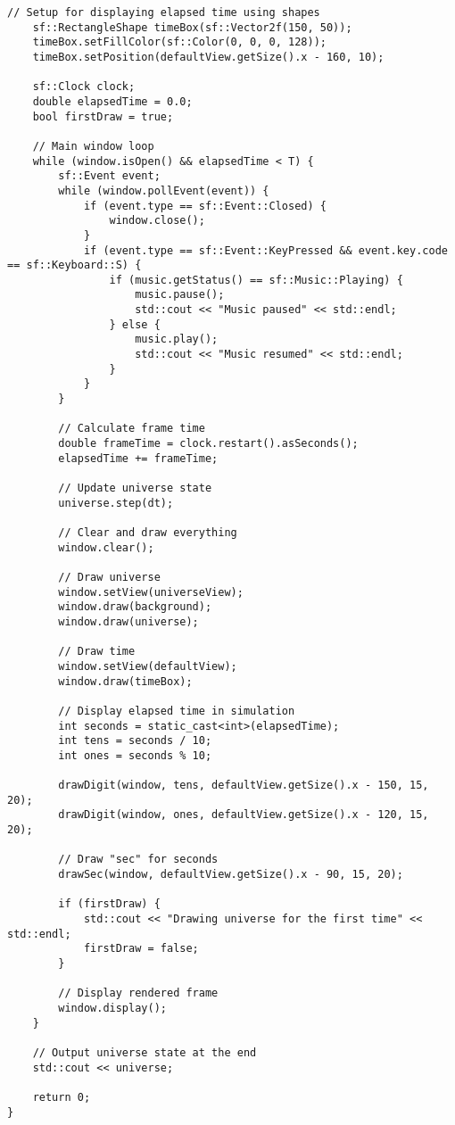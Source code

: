 \documentclass[12pt]{article}
\begin{document}
\begin{lstlisting}[style=cppcode]
    // Setup for displaying elapsed time using shapes
    sf::RectangleShape timeBox(sf::Vector2f(150, 50));
    timeBox.setFillColor(sf::Color(0, 0, 0, 128));
    timeBox.setPosition(defaultView.getSize().x - 160, 10);

    sf::Clock clock;
    double elapsedTime = 0.0;
    bool firstDraw = true;

    // Main window loop
    while (window.isOpen() && elapsedTime < T) {
        sf::Event event;
        while (window.pollEvent(event)) {
            if (event.type == sf::Event::Closed) {
                window.close();
            }
            if (event.type == sf::Event::KeyPressed && event.key.code == sf::Keyboard::S) {
                if (music.getStatus() == sf::Music::Playing) {
                    music.pause();
                    std::cout << "Music paused" << std::endl;
                } else {
                    music.play();
                    std::cout << "Music resumed" << std::endl;
                }
            }
        }

        // Calculate frame time
        double frameTime = clock.restart().asSeconds();
        elapsedTime += frameTime;

        // Update universe state
        universe.step(dt);

        // Clear and draw everything
        window.clear();

        // Draw universe
        window.setView(universeView);
        window.draw(background);
        window.draw(universe);

        // Draw time
        window.setView(defaultView);
        window.draw(timeBox);

        // Display elapsed time in simulation
        int seconds = static_cast<int>(elapsedTime);
        int tens = seconds / 10;
        int ones = seconds % 10;

        drawDigit(window, tens, defaultView.getSize().x - 150, 15, 20);
        drawDigit(window, ones, defaultView.getSize().x - 120, 15, 20);

        // Draw "sec" for seconds
        drawSec(window, defaultView.getSize().x - 90, 15, 20);

        if (firstDraw) {
            std::cout << "Drawing universe for the first time" << std::endl;
            firstDraw = false;
        }

        // Display rendered frame
        window.display();
    }

    // Output universe state at the end
    std::cout << universe;

    return 0;
}
\end{lstlisting}
\end{document}
